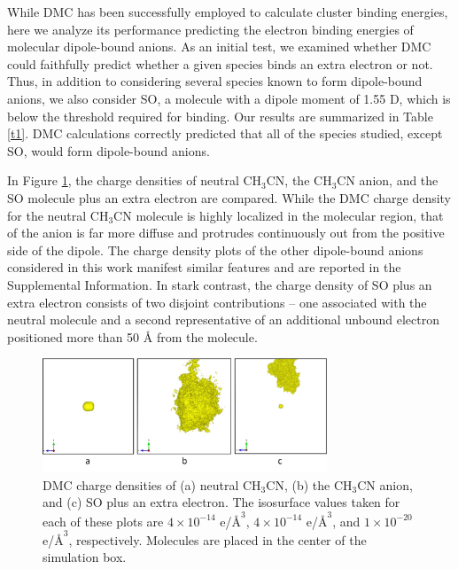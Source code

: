 While DMC has been successfully employed to calculate cluster binding energies,\cite{Xu_JPCA_2010,Wang_JPCA_2013} here we analyze its performance predicting the electron binding energies of molecular dipole-bound anions. As an initial test, we examined whether DMC could faithfully predict whether a given species binds an extra electron or not. Thus, in addition to considering several species known to form dipole-bound anions, we also consider SO, a molecule with a dipole moment of 1.55 D, which is below the threshold required for binding. Our results are summarized in Table \ref{t1}. DMC calculations correctly predicted that all of the species studied, except SO, would form dipole-bound anions. 

In Figure \ref{f1}, the charge densities of neutral CH$_{3}$CN, the CH$_{3}$CN anion, and the SO molecule plus an extra electron are compared. While the DMC charge density for the neutral CH$_{3}$CN molecule is highly localized in the molecular region, that of the anion is far more diffuse and protrudes continuously out from the positive side of the dipole. The charge density plots of the other dipole-bound anions considered in this work manifest similar features and are reported in the Supplemental Information. In stark contrast, the charge density of SO plus an extra electron consists of two disjoint contributions -- one associated with the neutral molecule and a second representative of an additional unbound electron positioned more than 50 $\mbox{\AA}$ from the molecule. 
\begin{center}
\begin{figure}[htbp]
\includegraphics[width=8.5cm]{Images/chapter2/Neutral-anion-SO.pdf}
\caption{DMC charge densities of (a) neutral CH$_3$CN, (b) the CH$_3$CN anion, and (c) SO plus an extra electron. The isosurface values taken for each of these plots are $4 \times 10^{-14}$ e/$\mbox{\AA}^3$, $4\times 10^{-14}$ e/$\mbox{\AA}^3$, and $1 \times 10^{-20}$ e/$\mbox{\AA}^3$, respectively. Molecules are placed in the center of the simulation box.}
\label{f1}
\end{figure}
\end{center}

